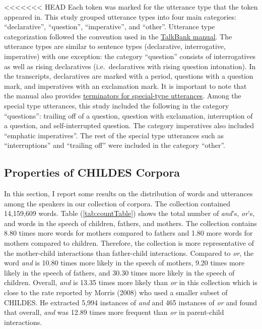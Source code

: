 \documentclass[,man,floatsintext]{apa6}
\begin{document}
<<<<<<< HEAD
Each token was marked for the utterance type that the token appeared in. This study grouped utterance types into four main categories: \enquote{declarative}, \enquote{question}, \enquote{imperative}, and \enquote{other}. Utterance type categorization followed the convention used in the \href{https://talkbank.org/manuals/CHAT.html\#_Toc486414422}{TalkBank manual}. The utterance types are similar to sentence types (declarative, interrogative, imperative) with one exception: the category \enquote{question} consists of interrogatives as well as rising declaratives (i.e.~declaratives with rising question intonation). In the transcripts, declaratives are marked with a period, questions with a question mark, and imperatives with an exclamation mark. It is important to note that the manual also provides \href{https://talkbank.org/manuals/CHAT.html\#_Toc486414431}{terminators for special-type utterances}. Among the special type utterances, this study included the following in the category \enquote{questions}: trailing off of a question, question with exclamation, interruption of a question, and self-interrupted question. The category imperatives also included \enquote{emphatic imperatives}. The rest of the special type utterances such as \enquote{interruptions} and \enquote{trailing off} were included in the category \enquote{other}.\\

\hypertarget{properties-of-childes-corpora}{%
\subsection{Properties of CHILDES Corpora}\label{properties-of-childes-corpora}}

In this section, I report some results on the distribution of words and utterances among the speakers in our collection of corpora. The collection contained 14,159,609 words. Table (\ref{tab:countTable}) shows the total number of \emph{and}'s, \emph{or}'s, and words in the speech of children, fathers, and mothers. The collection contains 8.80 times more words for mothers compared to fathers and 1.80 more words for mothers compared to children. Therefore, the collection is more representative of the mother-child interactions than father-child interactions. Compared to \emph{or}, the word \emph{and} is 10.80 times more likely in the speech of mothers, 9.20 times more likely in the speech of fathers, and 30.30 times more likely in the speech of children. Overall, \emph{and} is 13.35 times more likely than \emph{or} in this collection which is close to the rate reported by Morris (2008) who used a smaller subset of CHILDES. He extracted 5,994 instances of \emph{and} and 465 instances of \emph{or} and found that overall, \emph{and} was 12.89 times more frequent than \emph{or} in parent-child interactions.
\end{document}
